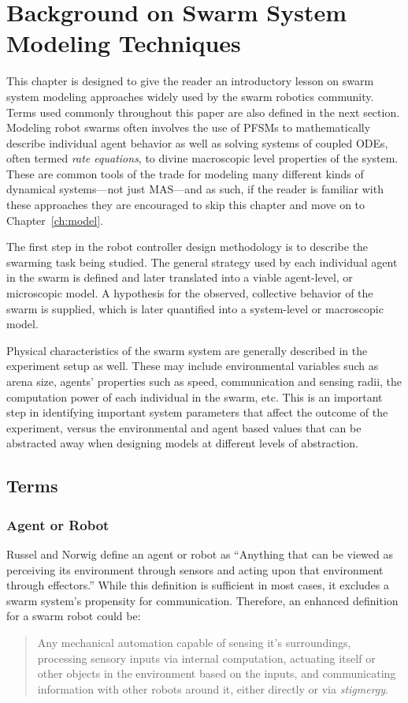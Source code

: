 \documentclass[12pt]{book}
\begin{document}
\chapter{Background on Swarm System Modeling Techniques}\label{ch:background}
This chapter is designed to give the reader an introductory lesson on swarm system modeling approaches widely used by the swarm robotics community. Terms used commonly throughout this paper are also defined in the next section. Modeling robot swarms often involves the use of PFSMs to mathematically describe individual agent behavior as well as solving systems of coupled ODEs, often termed \emph{rate equations}, to divine macroscopic level properties of the system. These are common tools of the trade for modeling many different kinds of dynamical systems---not just MAS---and as such, if the reader is familiar with these approaches they are encouraged to skip this chapter and move on to Chapter~\ref{ch:model}.

The first step in the robot controller design methodology is to describe the swarming task being studied. The general strategy used by each individual agent in the swarm is defined and later translated into a viable agent-level, or microscopic model. A hypothesis for the observed, collective behavior of the swarm is supplied, which is later quantified into a system-level or macroscopic model.

Physical characteristics of the swarm system are generally described in the experiment setup as well. These may include environmental variables such as arena size, agents' properties such as speed, communication and sensing radii, the computation power of each individual in the swarm, etc. This is an important step in identifying important system parameters that affect the outcome of the experiment, versus the environmental and agent based values that can be abstracted away when designing models at different levels of abstraction.

\section{Terms}
\subsection{Agent or Robot}
Russel and Norwig \cite{Russel1995} define an agent or robot as ``Anything that can be viewed as perceiving its environment through sensors and acting upon that environment through effectors.'' While this definition is sufficient in most cases, it excludes a swarm system's propensity for communication. Therefore, an enhanced definition for a swarm robot could be: 
\begin{quote}
Any mechanical automation capable of sensing it's surroundings, processing sensory inputs via internal computation, actuating itself or other objects in the environment based on the inputs, and communicating information with other robots around it, either directly or via \emph{stigmergy}.
\end{quote}
\end{document}
